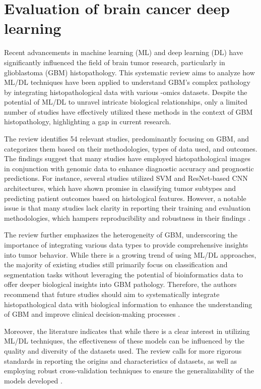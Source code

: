 \documentclass[runningheads]{llncs}
\begin{document}
\section{Evaluation of brain cancer deep learning}
Recent advancements in machine learning (ML) and deep learning (DL) have significantly influenced the field of brain tumor research, particularly in glioblastoma (GBM) histopathology. This systematic review aims to analyze how ML/DL techniques have been applied to understand GBM's complex pathology by integrating histopathological data with various -omics datasets. Despite the potential of ML/DL to unravel intricate biological relationships, only a limited number of studies have effectively utilized these methods in the context of GBM histopathology, highlighting a gap in current research. 

The review identifies 54 relevant studies, predominantly focusing on GBM, and categorizes them based on their methodologies, types of data used, and outcomes. The findings suggest that many studies have employed histopathological images in conjunction with genomic data to enhance diagnostic accuracy and prognostic predictions. For instance, several studies utilized SVM and ResNet-based CNN architectures, which have shown promise in classifying tumor subtypes and predicting patient outcomes based on histological features. However, a notable issue is that many studies lack clarity in reporting their training and evaluation methodologies, which hampers reproducibility and robustness in their findings \cite{Chun_2025}.

The review further emphasizes the heterogeneity of GBM, underscoring the importance of integrating various data types to provide comprehensive insights into tumor behavior. While there is a growing trend of using ML/DL approaches, the majority of existing studies still primarily focus on classification and segmentation tasks without leveraging the potential of bioinformatics data to offer deeper biological insights into GBM pathology. Therefore, the authors recommend that future studies should aim to systematically integrate histopathological data with biological information to enhance the understanding of GBM and improve clinical decision-making processes \cite{Chun_2025}.

Moreover, the literature indicates that while there is a clear interest in utilizing ML/DL techniques, the effectiveness of these models can be influenced by the quality and diversity of the datasets used. The review calls for more rigorous standards in reporting the origins and characteristics of datasets, as well as employing robust cross-validation techniques to ensure the generalizability of the models developed \cite{Amran_2024}. 
\end{document}
